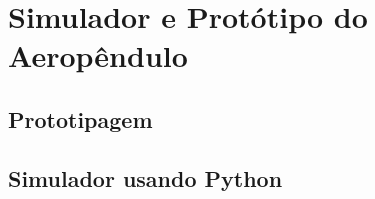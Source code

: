 \chapter{Simulador e Protótipo do Aeropêndulo}

\lipsum[1] %

\section{Prototipagem}


\section{ Simulador usando Python}

